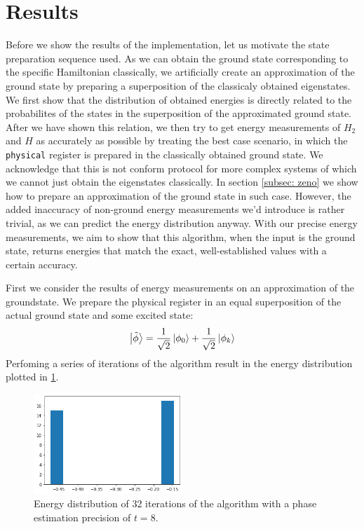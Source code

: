 \section{Results}
Before we show the results of the implementation, let us motivate the state preparation sequence used. As we can obtain the ground state corresponding to the specific Hamiltonian classically, we artificially create an approximation of the ground state by preparing a superposition of the classicaly obtained eigenstates. We first show that the distribution of obtained energies is directly related to the probabilites of the states in the superposition of the approximated ground state. After we have shown this relation, we then try to get energy measurements of $H_2$ and $H$ as accurately as possible by treating the best case scenario, in which the \verb|physical| register is prepared in the classically obtained ground state. We acknowledge that this is not conform protocol for more complex systems of which we cannot just obtain the eigenstates classically. In section \ref{subsec: zeno} we show how to prepare an approximation of the ground state in such case. However, the added inaccuracy of non-ground energy measurements we'd introduce is rather trivial, as we can predict the energy distribution anyway. With our precise energy measurements, we aim to show that this algorithm, when the input is the ground state, returns energies that match the exact, well-established values with a certain accuracy.

\vspace{5mm}
First we consider the results of energy measurements on an approximation of the groundstate. We prepare the physical register in an equal superposition of the actual ground state and some excited state:
\begin{equation}
  \left\vert{\tilde{\phi}}\right\rangle = \frac{1}{\sqrt{2}} \left\vert{\phi_0}\right\rangle + \frac{1}{\sqrt{2}} \left\vert{\phi_k}\right\rangle
\end{equation} Perfoming a series of iterations of the algorithm result in the energy distribution plotted in \ref{distr}.

\begin{figure}[h] \label{distr}
  \center \includegraphics[width = 0.5\textwidth]{proofofsuper.png}
  \caption{Energy distribution of 32 iterations of the algorithm with a phase estimation precision of $t = 8$.}
\end{figure}

